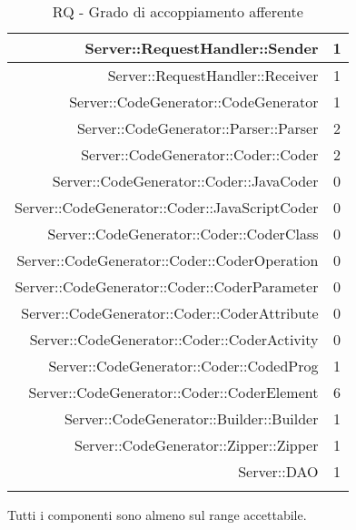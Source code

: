 \documentclass[../PianoDiQualifica.tex]{subfiles}
\begin{document}
\begin{longtable}{|r|c|}
						Server::RequestHandler::Sender & 1 \\ \hline
						Server::RequestHandler::Receiver & 1 \\ \hline
						Server::CodeGenerator::CodeGenerator & 1 \\ \hline
						Server::CodeGenerator::Parser::Parser & 2 \\ \hline
						Server::CodeGenerator::Coder::Coder & 2 \\ \hline
						Server::CodeGenerator::Coder::JavaCoder & 0 \\ \hline
						Server::CodeGenerator::Coder::JavaScriptCoder & 0 \\ \hline
						Server::CodeGenerator::Coder::CoderClass & 0 \\ \hline
						Server::CodeGenerator::Coder::CoderOperation & 0 \\ \hline
						Server::CodeGenerator::Coder::CoderParameter & 0 \\ \hline
						Server::CodeGenerator::Coder::CoderAttribute & 0 \\ \hline
						Server::CodeGenerator::Coder::CoderActivity & 0 \\ \hline
						Server::CodeGenerator::Coder::CodedProg & 1 \\ \hline
						Server::CodeGenerator::Coder::CoderElement & 6 \\ \hline
						Server::CodeGenerator::Builder::Builder & 1 \\ \hline
						Server::CodeGenerator::Zipper::Zipper & 1 \\ \hline
						Server::DAO & 1 \\ \hline
					\caption{RQ - Grado di accoppiamento afferente}
					\end{longtable}
					Tutti i componenti sono almeno sul range accettabile.
\end{document}
